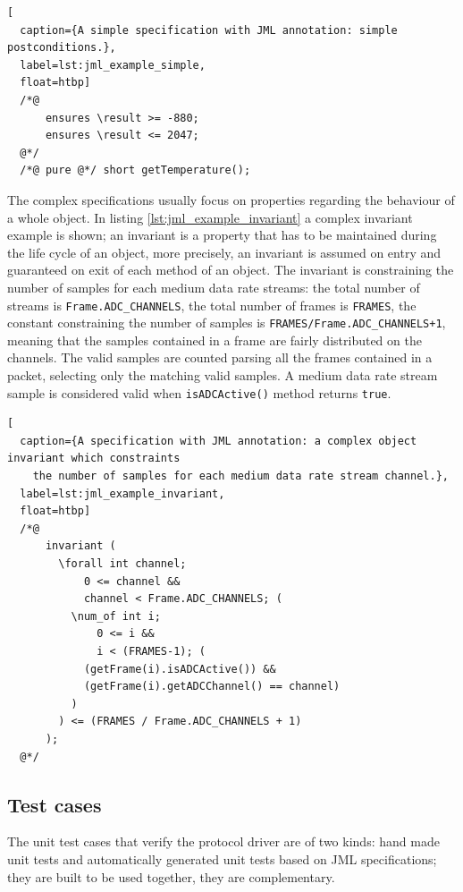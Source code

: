 \documentclass[english]{lni}
\newcommand{\lil}[1]{\texttt{\lstinline|#1|}}
\begin{document}
\begin{lstlisting}[
  caption={A simple specification with JML annotation: simple postconditions.},
  label=lst:jml_example_simple,
  float=htbp]
  /*@ 
      ensures \result >= -880; 
      ensures \result <= 2047; 
  @*/ 
  /*@ pure @*/ short getTemperature();
\end{lstlisting}

\sloppy

The complex specifications usually focus on properties regarding the behaviour of a whole object.
In listing \ref{lst:jml_example_invariant} a complex invariant example is shown; an invariant is a property that has to be maintained during the life cycle of an object, more precisely, an invariant is assumed on entry and guaranteed on exit of each method of an object. 
The invariant is constraining the number of samples for each medium data rate streams: the total number of streams is \lil{Frame.ADC_CHANNELS}, the total number of frames is \lil{FRAMES}, the constant constraining the number of samples is \lil{FRAMES/Frame.ADC_CHANNELS+1}, meaning that the samples contained in a frame are fairly distributed on the channels.
The valid samples are counted parsing all the frames contained in a packet, selecting only the matching valid samples.  
A medium data rate stream sample is considered valid when \lil{isADCActive()} method returns \lil{true}.

\fussy

\begin{lstlisting}[
  caption={A specification with JML annotation: a complex object invariant which constraints 
    the number of samples for each medium data rate stream channel.},
  label=lst:jml_example_invariant,
  float=htbp]
  /*@ 
      invariant ( 
        \forall int channel; 
            0 <= channel && 
            channel < Frame.ADC_CHANNELS; ( 
          \num_of int i; 
              0 <= i && 
              i < (FRAMES-1); (
            (getFrame(i).isADCActive()) && 
            (getFrame(i).getADCChannel() == channel)
          ) 
        ) <= (FRAMES / Frame.ADC_CHANNELS + 1) 
      ); 
  @*/
\end{lstlisting}



\subsection{Test cases}
\label{subsec:test_cases}

The unit test cases that verify the protocol driver are of two kinds: hand made unit tests and automatically generated unit tests based on JML specifications; they are built to be used together, they are complementary.  
\end{document}
